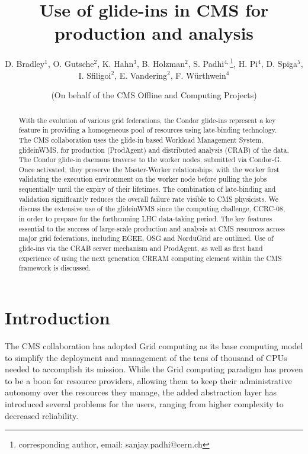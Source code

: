 \documentclass[a4paper]{jpconf}
\begin{document}
\title{Use of glide-ins in CMS for production and analysis}
\author{D. Bradley$^1$, O. Gutsche$^2$, K. Hahn$^3$, B. Holzman$^2$, S. Padhi$^{4,}$\footnote[6]{corresponding author, email: sanjay.padhi@cern.ch}, H. Pi$^4$, D. Spiga$^5$, I. Sfiligoi$^2$, E. Vandering$^2$, F. W\"urthwein$^4$}
\address{$^1$ University of Wisconsin-Madison, Madison, WI, USA}
\address{$^2$ Fermilab, Batavia, IL, USA}
\address{$^3$ Massachusetts Institute of Technology, Cambridge, MA, USA}
\address{$^4$ University of California, San Diego, La Jolla, CA, USA}
\address{$^5$ CERN, CH-1211 Geneva, Switzerland}
\author{(On behalf of the CMS Offline and Computing Projects)}
\begin{abstract}
With the evolution of various grid federations, the Condor glide-ins represent a key feature in providing a homogeneous pool of resources using late-binding technology. The CMS collaboration uses the glide-in based Workload Management System, glideinWMS, for production (ProdAgent) and distributed analysis (CRAB) of the data. The Condor glide-in daemons traverse to the worker nodes, submitted via Condor-G. Once activated, they preserve the Master-Worker relationships, with the worker first validating the execution environment on the worker node before pulling the jobs sequentially until the expiry of their lifetimes. The combination of late-binding and validation significantly reduces the overall failure rate visible to CMS physicists. We discuss the extensive use of the glideinWMS since the computing challenge, CCRC-08, in order to prepare for the forthcoming LHC data-taking period. The key features essential to the success of large-scale production and analysis at CMS resources across major grid federations, including EGEE, OSG and NorduGrid are outlined. Use of glide-ins via the CRAB server mechanism and ProdAgent, as well as first hand experience of using the next generation CREAM computing element within the CMS framework is discussed.
\end{abstract}
\section{Introduction}
The CMS collaboration has adopted Grid computing as its base computing model to simplify the deployment and management of the
tens of thousand of CPUs needed to accomplish its mission.
While the Grid computing paradigm has proven to be a boon for resource providers, 
allowing them to keep their administrative autonomy over the resources they manage,
the added abstraction layer has introduced several problems for the users, 
ranging from higher complexity to decreased reliability.
\end{document}
